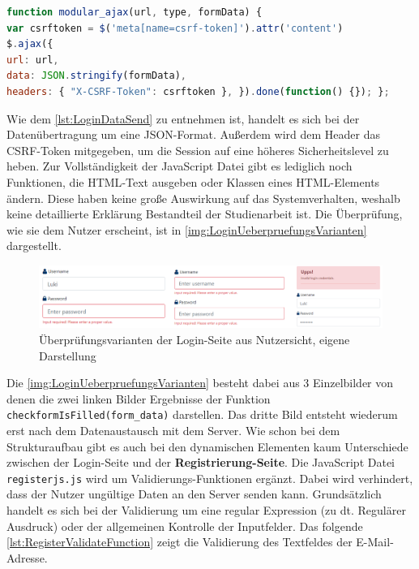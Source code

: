 \documentclass[a4paper,titlepage,halfparskip,12pt]{scrreprt}
\begin{document}
\begin{onehalfspacing}
\begin{lstlisting}[language=Javascript,caption=Ausschnitt aus \textit{modular\_ajax()},label={lst:LoginDataSend}]
function modular_ajax(url, type, formData) {
var csrftoken = $('meta[name=csrf-token]').attr('content')
$.ajax({
url: url,
data: JSON.stringify(formData),
headers: { "X-CSRF-Token": csrftoken }, }).done(function() {}); };
\end{lstlisting}
Wie dem \autoref{lst:LoginDataSend} zu entnehmen ist, handelt es sich bei der Datenübertragung um eine JSON-Format. Außerdem wird dem Header das CSRF-Token mitgegeben, um die Session auf eine höheres Sicherheitslevel zu heben. Zur Vollständigkeit der JavaScript Datei gibt es lediglich noch Funktionen, die \ac{HTML}-Text ausgeben oder Klassen eines \ac{HTML}-Elements ändern. Diese haben keine große Auswirkung auf das Systemverhalten, weshalb keine detaillierte Erklärung Bestandteil der Studienarbeit ist. Die Überprüfung, wie sie dem Nutzer erscheint, ist in \autoref{img:LoginUeberpruefungsVarianten} dargestellt.
\begin{figure}[h]
	\centering
	\includegraphics[width=\linewidth]{images/LoginUeberpruefungJSGesamt}
	\caption{Überprüfungsvarianten der Login-Seite aus Nutzersicht, eigene Darstellung}
	\label{img:LoginUeberpruefungsVarianten}
\end{figure}
Die \autoref{img:LoginUeberpruefungsVarianten} besteht dabei aus 3 Einzelbilder von denen die zwei linken Bilder Ergebnisse der Funktion \texttt{checkformIsFilled(form\_data)} darstellen. Das dritte Bild entsteht wiederum erst nach dem Datenaustausch mit dem Server. Wie schon bei dem Strukturaufbau gibt es auch bei den dynamischen Elementen kaum Unterschiede zwischen der Login-Seite und der \textbf{Registrierung-Seite}. Die JavaScript Datei \texttt{registerjs.js} wird um Validierungs-Funktionen ergänzt. Dabei wird verhindert, dass der Nutzer ungültige Daten an den Server senden kann. Grundsätzlich handelt es sich bei der Validierung um eine regular Expression (zu dt. Regulärer Ausdruck) oder der allgemeinen Kontrolle der Inputfelder. Das folgende \autoref{lst:RegisterValidateFunction} zeigt die Validierung des Textfeldes der E-Mail-Adresse.
\begin{lstlisting}[language=Javascript,caption=Validierungsfunktion \textit{validateEmail()},label={lst:RegisterValidateFunction}]

\end{lstlisting}
\end{onehalfspacing}
\end{document}
